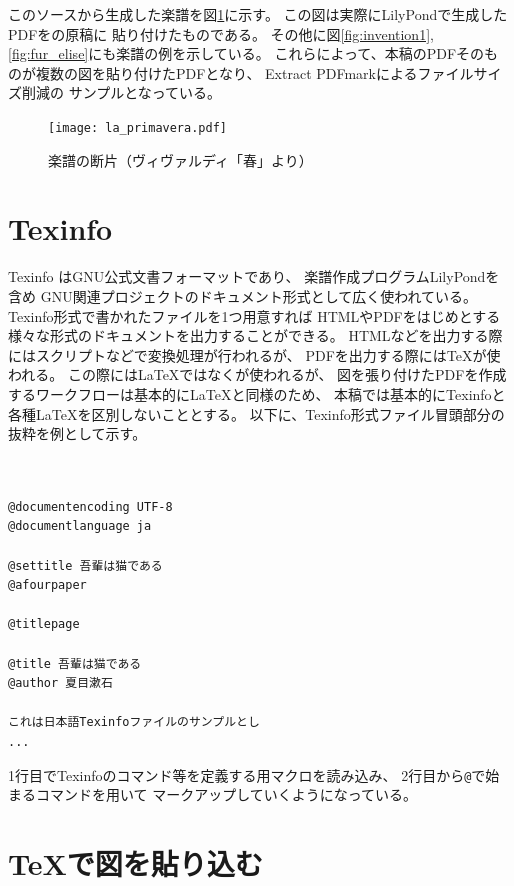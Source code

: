 \documentclass[twocolumn,jafontscale=0.962216,jlreq_notes]{jlreq}
\begin{document}
このソースから生成した楽譜を図\ref{fig:la_primavera}に示す。
この図は実際にLilyPondで生成したPDFをの原稿に
貼り付けたものである。
その他に図\ref{fig:invention1}, \ref{fig:fur_elise}にも楽譜の例を示している。
これらによって、本稿のPDFそのものが複数の図を貼り付けたPDFとなり、
Extract PDFmarkによるファイルサイズ削減の
サンプルとなっている。

\begin{figure}
  \centering
  \texttt{[image: la\_primavera.pdf]}
  \caption{楽譜の断片（ヴィヴァルディ「春」より）}
  \label{fig:la_primavera}
\end{figure}

\section{Texinfo}

Texinfo \cite{texinfo}はGNU公式文書フォーマットであり、
楽譜作成プログラムLilyPondを含め
GNU関連プロジェクトのドキュメント形式として広く使われている。
Texinfo形式で書かれたファイルを1つ用意すれば
HTMLやPDFをはじめとする様々な形式のドキュメントを出力することができる。
HTMLなどを出力する際にはスクリプトなどで変換処理が行われるが、
PDFを出力する際には\TeX が使われる。
この際には\LaTeX ではなくが使われるが、
図を張り付けたPDFを作成するワークフローは基本的に\LaTeX と同様のため、
本稿では基本的にTexinfoと各種\LaTeX を区別しないこととする。
以下に、Texinfo形式ファイル冒頭部分の抜粋を例として示す。

\begin{tcolorbox}[left=0mm,right=0mm,top=0mm,bottom=0mm]
\begin{lstlisting}


@documentencoding UTF-8
@documentlanguage ja

@settitle 吾輩は猫である
@afourpaper

@titlepage

@title 吾輩は猫である
@author 夏目漱石

これは日本語Texinfoファイルのサンプルとし
...
\end{lstlisting}
\end{tcolorbox}

1行目でTexinfoのコマンド等を定義する用マクロを読み込み、
2行目から\verb|@|で始まるコマンドを用いて
マークアップしていくようになっている。

\section{\TeX で図を貼り込む}
\end{document}
